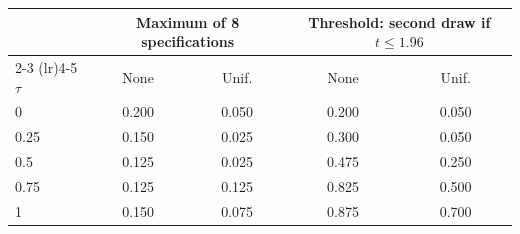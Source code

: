 \begin{tabular}{lcccc}
\toprule
 & \multicolumn{2}{c}{Maximum of 8 specifications} & \multicolumn{2}{c}{Threshold: second draw if $t \le 1.96$} \\
\cmidrule(lr){2-3} \cmidrule(lr){4-5}
$\tau$ & None & Unif. & None & Unif. \\
\midrule
0 & 0.200 & 0.050 & 0.200 & 0.050 \\
0.25 & 0.150 & 0.025 & 0.300 & 0.050 \\
0.5 & 0.125 & 0.025 & 0.475 & 0.250 \\
0.75 & 0.125 & 0.125 & 0.825 & 0.500 \\
1 & 0.150 & 0.075 & 0.875 & 0.700 \\
\bottomrule
\end{tabular}
